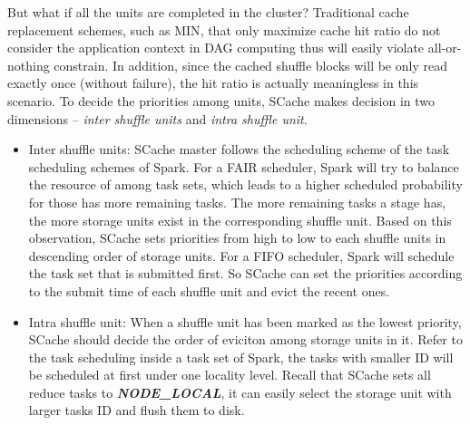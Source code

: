 But what if all the units are completed in the cluster? Traditional cache replacement schemes, such as MIN\cite{min}, that only maximize cache hit ratio do not consider the application context in DAG computing thus will easily violate all-or-nothing constrain. In addition, since the cached shuffle blocks will be only read exactly once (without failure), the hit ratio is actually meaningless in this scenario. To decide the priorities among units, SCache makes decision in two dimensions -- \textit{inter shuffle units} and \textit{intra shuffle unit}. 
\begin{itemize}[noitemsep]
	\item Inter shuffle units: SCache master follows the scheduling scheme of the task scheduling schemes of Spark. For a FAIR scheduler, Spark will try to balance the resource of among task sets, which leads to a higher scheduled probability for those has more remaining tasks.  The more remaining tasks a stage has, the more storage units exist in the corresponding shuffle unit. Based on this observation, SCache sets priorities from high to low to each shuffle units in descending order of storage units. For a FIFO scheduler, Spark will schedule the task set that is submitted first. So SCache can set the priorities according to the submit time of each shuffle unit and evict the recent ones.
	\item Intra shuffle unit: When a shuffle unit has been marked as the lowest priority, SCache should decide the order of eviciton among storage units in it. Refer to the task scheduling inside a task set of Spark, the tasks with smaller ID will be scheduled at first under one locality level. Recall that SCache sets all reduce tasks to \textbf{\textit{NODE\_LOCAL}}, it can easily select the storage unit with larger tasks ID and flush them to disk.
\end{itemize}



